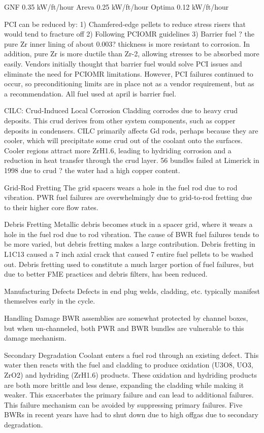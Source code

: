 \documentclass[10pt]{article}
\begin{document}
GNF
0.35 kW/ft/hour
Areva
0.25 kW/ft/hour
Optima
0.12 kW/ft/hour

PCI can be reduced by:
1)	Chamfered-edge pellets to reduce stress risers that would tend to fracture off
2)	Following PCIOMR guidelines
3)	Barrier fuel ? the pure Zr inner lining of about 0.003? thickness is more resistant to corrosion. In addition, pure Zr is more ductile than Zr-2, allowing stresses to be absorbed more easily. Vendors initially thought that barrier fuel would solve PCI issues and eliminate the need for PCIOMR limitations. However, PCI failures continued to occur, so preconditioning limits are in place not as a vendor requirement, but as a recommendation. All fuel used at april is barrier fuel. 

CILC: Crud-Induced Local Corrosion
Cladding corrodes due to heavy crud deposits. This crud derives from other system components, such as copper deposits in condensers. CILC primarily affects Gd rods, perhaps because they are cooler, which will precipitate some crud out of the coolant onto the surfaces. Cooler regions attract more ZrH1.6, leading to hydriding corrosion and a reduction in heat transfer through the crud layer. 56 bundles failed at Limerick in 1998 due to crud ? the water had a high copper content. 

Grid-Rod Fretting
The grid spacers wears a hole in the fuel rod due to rod vibration. PWR fuel failures are overwhelmingly due to grid-to-rod fretting due to their higher core flow rates. 

Debris Fretting
Metallic debris becomes stuck in a spacer grid, where it wears a hole in the fuel rod due to rod vibration. The cause of BWR fuel failures tends to be more varied, but debris fretting makes a large contribution. Debris fretting in L1C13 caused a 7 inch axial crack that caused 7 entire fuel pellets to be washed out. Debris fretting used to constitute a much larger portion of fuel failures, but due to better FME practices and debris filters, has been reduced.

Manufacturing Defects
Defects in end plug welds, cladding, etc. typically manifest themselves early in the cycle. 

Handling Damage
BWR assemblies are somewhat protected by channel boxes, but when un-channeled, both PWR and BWR bundles are vulnerable to this damage mechanism. 

Secondary Degradation
Coolant enters a fuel rod through an existing defect. This water then reacts with the fuel and cladding to produce oxidation (U3O8, UO3, ZrO2) and hydriding (ZrH1.6) products. These oxidation and hydriding products are both more brittle and less dense, expanding the cladding while making it weaker. This exacerbates the primary failure and can lead to additional failures. This failure mechanism can be avoided by suppressing primary failures. Five BWRs in recent years have had to shut down due to high offgas due to secondary degradation.
\end{document}
